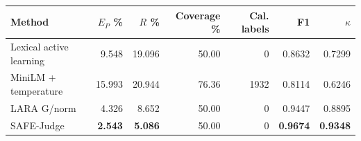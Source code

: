 \begin{tabular}{@{}lrrrrrr@{}}
\toprule
Method & $E_P$ \% & $R$ \% & Coverage \% & Cal. labels & F1 & $\kappa$ \\
\midrule
Lexical active learning & 9.548 & 19.096 & 50.00 & 0 & 0.8632 & 0.7299 \\
MiniLM + temperature & 15.993 & 20.944 & 76.36 & 1932 & 0.8114 & 0.6246 \\
LARA G/norm & 4.326 & 8.652 & 50.00 & 0 & 0.9447 & 0.8895 \\
SAFE-Judge & \textbf{2.543} & \textbf{5.086} & 50.00 & 0 & \textbf{0.9674} & \textbf{0.9348} \\
\bottomrule
\end{tabular}
